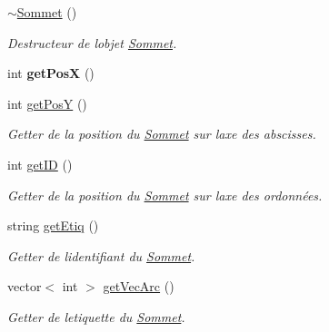 \begin{DoxyCompactItemize}
\mbox{\label{classSommet_a23a7ad681b25488d94737c8b5ae50eb4}} 
\hyperlink{classSommet_a23a7ad681b25488d94737c8b5ae50eb4}{$\sim$\+Sommet} ()
\begin{DoxyCompactList}\small\item\em Destructeur de l\textquotesingle{}objet \hyperlink{classSommet}{Sommet}. \end{DoxyCompactList}\item 
\mbox{\label{classSommet_af780f59cab1e9f04b69a5c91050eda98}} 
int {\bfseries get\+PosX} ()
\item 
\mbox{\label{classSommet_a68d4df6fc658bc74838a719e3c2695ce}} 
int \hyperlink{classSommet_a68d4df6fc658bc74838a719e3c2695ce}{get\+PosY} ()
\begin{DoxyCompactList}\small\item\em Getter de la position du \hyperlink{classSommet}{Sommet} sur l\textquotesingle{}axe des abscisses. \end{DoxyCompactList}\item 
\mbox{\label{classSommet_a87b19daa13eda2dad89be33b2f52c832}} 
int \hyperlink{classSommet_a87b19daa13eda2dad89be33b2f52c832}{get\+ID} ()
\begin{DoxyCompactList}\small\item\em Getter de la position du \hyperlink{classSommet}{Sommet} sur l\textquotesingle{}axe des ordonn\'{e}es. \end{DoxyCompactList}\item 
\mbox{\label{classSommet_a9f9190ecd63918666322ae2c457af0e3}} 
string \hyperlink{classSommet_a9f9190ecd63918666322ae2c457af0e3}{get\+Etiq} ()
\begin{DoxyCompactList}\small\item\em Getter de l\textquotesingle{}identifiant du \hyperlink{classSommet}{Sommet}. \end{DoxyCompactList}\item 
\mbox{\label{classSommet_a72a474f22accc4288b70662c7985a6f4}} 
vector$<$ int $>$ \hyperlink{classSommet_a72a474f22accc4288b70662c7985a6f4}{get\+Vec\+Arc} ()
\begin{DoxyCompactList}\small\item\em Getter de l\textquotesingle{}etiquette du \hyperlink{classSommet}{Sommet}. \end{DoxyCompactList}\item 

\end{DoxyCompactItemize}
